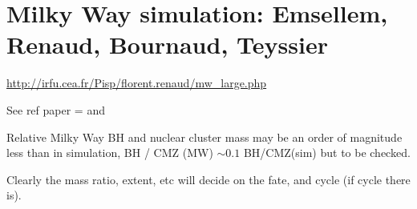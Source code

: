 \section{Milky Way simulation: Emsellem, Renaud, Bournaud, Teyssier}

\url{http://irfu.cea.fr/Pisp/florent.renaud/mw_large.php}

See ref paper = \cite{Renaud_2013} and \cite{Emsellem_2014}

Relative Milky Way BH and nuclear cluster mass may be an order of magnitude less than in simulation, BH / CMZ (MW) $\sim0.1$ BH/CMZ(sim) but to be checked.

Clearly the mass ratio, extent, etc will decide on the fate, and cycle (if cycle there is).